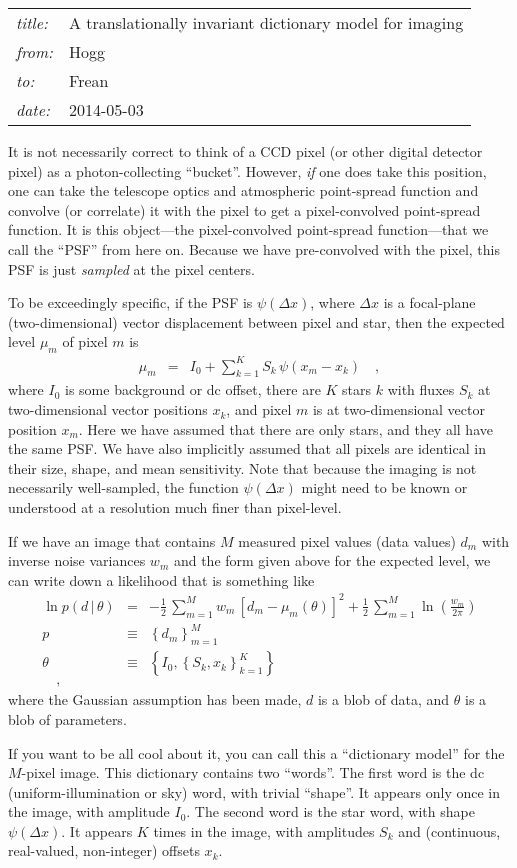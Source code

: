 \documentclass[12pt]{article}
\newcommand{\given}{\,|\,}
\begin{document}
\sloppy\sloppypar

\noindent
\begin{tabular}{ll}
\textsl{title:}   & A translationally invariant dictionary model for imaging  \\
\textsl{from:}    & Hogg \\
\textsl{to:}      & Frean \\
\textsl{date:}    & 2014-05-03
\end{tabular}
\bigskip

It is not necessarily correct to think of a CCD pixel (or other
digital detector pixel) as a photon-collecting ``bucket''.
However, \emph{if} one does take this position, one can take the
telescope optics and atmospheric point-spread function and convolve
(or correlate) it with the pixel to get a pixel-convolved point-spread
function.
It is this object---the pixel-convolved point-spread function---that
we call the ``PSF'' from here on.
Because we have pre-convolved with the pixel, this PSF is just
\emph{sampled} at the pixel centers.

To be exceedingly specific, if the PSF is $\psi(\Delta x)$, where
$\Delta x$ is a focal-plane (two-dimensional) vector displacement
between pixel and star, then the expected level $\mu_m$ of pixel $m$
is
\begin{eqnarray}
\mu_m &=& I_0 + \sum_{k=1}^K S_k\,\psi(x_m - x_k)
\quad ,
\end{eqnarray}
where $I_0$ is some background or dc offset, there are $K$ stars $k$
with fluxes $S_k$ at two-dimensional vector positions $x_k$, and pixel
$m$ is at two-dimensional vector position $x_m$.
Here we have assumed that there are only stars, and they all have the
same PSF.
We have also implicitly assumed that all pixels are identical in their
size, shape, and mean sensitivity.
Note that because the imaging is not necessarily well-sampled, the
function $\psi(\Delta x)$ might need to be known or understood at a
resolution much finer than pixel-level.

If we have an image that contains $M$ measured pixel values (data
values) $d_m$ with inverse noise variances $w_m$ and the form given
above for the expected level, we can write down a likelihood that is
something like
\begin{eqnarray}
\ln p(d\given\theta) &=& -\frac{1}{2}\,\sum_{m=1}^M w_m\,[d_m - \mu_m(\theta)]^2 + \frac{1}{2}\,\sum_{m=1}^M \ln(\frac{w_m}{2\pi})
\\
p &\equiv& \left\{d_m\right\}_{m=1}^M
\\
\theta &\equiv& \left\{I_0, \left\{S_k, x_k\right\}_{k=1}^K\right\}
\\
\quad,
\end{eqnarray}
where the Gaussian assumption has been made, $d$ is a blob of data,
and $\theta$ is a blob of parameters.

If you want to be all cool about it, you can call this a ``dictionary
model'' for the $M$-pixel image.
This dictionary contains two ``words''.
The first word is the dc (uniform-illumination or sky) word, with
trivial ``shape''.
It appears only once in the image, with amplitude $I_0$.
The second word is the star word, with shape $\psi(\Delta x)$.
It appears $K$ times in the image, with amplitudes $S_k$ and
(continuous, real-valued, non-integer) offsets $x_k$.
\end{document}
